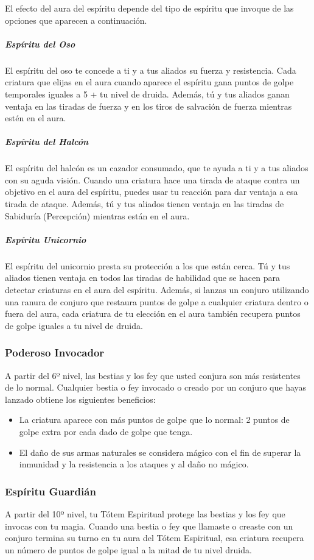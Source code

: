 \documentclass[a4paper,twocolumn,openany,10pt]{dndbook}
\begin{document}
El efecto del aura del espíritu depende del tipo de espíritu que invoque de las opciones que aparecen a continuación.

\subparagraph{Espíritu del Oso} El espíritu del oso te concede a ti y a tus aliados su fuerza y resistencia. Cada criatura que
elijas en el aura cuando aparece el espíritu gana puntos de golpe temporales iguales a 5 + tu nivel de druida. Además, tú y tus
aliados ganan ventaja en las tiradas de fuerza y en los tiros de salvación de fuerza mientras estén en el aura.

\subparagraph{Espíritu del Halcón} El espíritu del halcón es un cazador consumado, que te ayuda a ti y a tus aliados con su
aguda visión. Cuando una criatura hace una tirada de ataque contra un objetivo en el aura del espíritu, puedes usar tu reacción
para dar ventaja a esa tirada de ataque. Además, tú y tus aliados tienen ventaja en las tiradas de Sabiduría (Percepción)
mientras están en el aura. 

\subparagraph{Espíritu Unicornio} El espíritu del unicornio presta su protección a los que están cerca. Tú y tus aliados tienen
ventaja en todos las tiradas de habilidad que se hacen para detectar criaturas en el aura del espíritu. Además, si lanzas un
conjuro utilizando una ranura de conjuro que restaura puntos de golpe a cualquier criatura dentro o fuera del aura, cada criatura
de tu elección en el aura también recupera puntos de golpe iguales a tu nivel de druida. 

\subsubsection{Poderoso Invocador}
A partir del 6º nivel, las bestias y los fey que usted conjura son más resistentes de lo normal. Cualquier bestia o fey invocado
o creado por un conjuro que hayas lanzado obtiene los siguientes beneficios:

\begin{itemize}
\item La criatura aparece con más puntos de golpe que lo normal: 2 puntos de golpe extra por cada dado de golpe que tenga.
\item El daño de sus armas naturales se considera mágico con el fin de superar la inmunidad y la resistencia a los ataques y al daño no mágico. 
\end{itemize}

\subsubsection{Espíritu Guardián}
A partir del 10º nivel, tu Tótem Espiritual protege las bestias y los fey que invocas con tu magia. Cuando una bestia o fey que
llamaste o creaste con un conjuro termina su turno en tu aura del Tótem Espiritual, esa criatura recupera un número de puntos
de golpe igual a la mitad de tu nivel druida.
\end{document}
